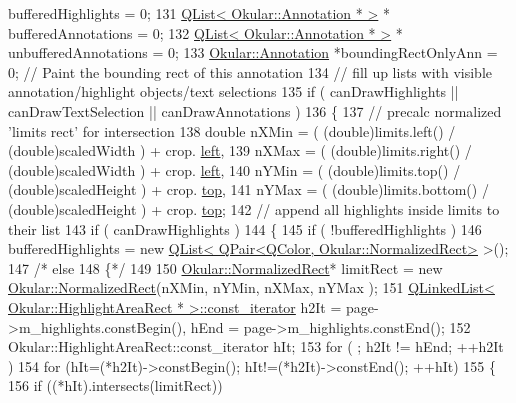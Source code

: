 \begin{DoxyCode}
      bufferedHighlights = 0;
131     \hyperlink{classQList}{QList< Okular::Annotation * >} * bufferedAnnotations = 0;
132     \hyperlink{classQList}{QList< Okular::Annotation * >} * unbufferedAnnotations = 0;
133     \hyperlink{classOkular_1_1Annotation}{Okular::Annotation} *boundingRectOnlyAnn = 0; \textcolor{comment}{// Paint the bounding rect of this
       annotation}
134     \textcolor{comment}{// fill up lists with visible annotation/highlight objects/text selections}
135     \textcolor{keywordflow}{if} ( canDrawHighlights || canDrawTextSelection || canDrawAnnotations )
136     \{
137         \textcolor{comment}{// precalc normalized 'limits rect' for intersection}
138         \textcolor{keywordtype}{double} nXMin = ( (double)limits.left() / (double)scaledWidth ) + crop.
      \hyperlink{classOkular_1_1NormalizedRect_a76336fe9d733f2b559cf8df3ef48f9e7}{left},
139                nXMax = ( (double)limits.right() / (double)scaledWidth )  + crop.
      \hyperlink{classOkular_1_1NormalizedRect_a76336fe9d733f2b559cf8df3ef48f9e7}{left},
140                nYMin = ( (double)limits.top() / (double)scaledHeight ) + crop.
      \hyperlink{classOkular_1_1NormalizedRect_acfb70f6417c993508d50090b512cb954}{top},
141                nYMax = ( (double)limits.bottom() / (double)scaledHeight ) + crop.
      \hyperlink{classOkular_1_1NormalizedRect_acfb70f6417c993508d50090b512cb954}{top};
142         \textcolor{comment}{// append all highlights inside limits to their list}
143         \textcolor{keywordflow}{if} ( canDrawHighlights )
144         \{
145             \textcolor{keywordflow}{if} ( !bufferedHighlights )
146                  bufferedHighlights = \textcolor{keyword}{new} 
      \hyperlink{classQList}{QList< QPair<QColor, Okular::NormalizedRect>} >();
147 \textcolor{comment}{/*            else}
148 \textcolor{comment}{            \{*/}
149                 
150                 \hyperlink{classOkular_1_1NormalizedRect}{Okular::NormalizedRect}* limitRect = \textcolor{keyword}{new} 
      \hyperlink{classOkular_1_1NormalizedRect}{Okular::NormalizedRect}(nXMin, nYMin, nXMax, nYMax );
151                 \hyperlink{classQLinkedList}{QLinkedList< Okular::HighlightAreaRect * >::const\_iterator}
       h2It = page->m\_highlights.constBegin(), hEnd = page->m\_highlights.constEnd();
152                 Okular::HighlightAreaRect::const\_iterator hIt;
153                 \textcolor{keywordflow}{for} ( ; h2It != hEnd; ++h2It )
154                     \textcolor{keywordflow}{for} (hIt=(*h2It)->constBegin(); hIt!=(*h2It)->constEnd(); ++hIt)
155                     \{
156                         \textcolor{keywordflow}{if} ((*hIt).intersects(limitRect))

\end{DoxyCode}
